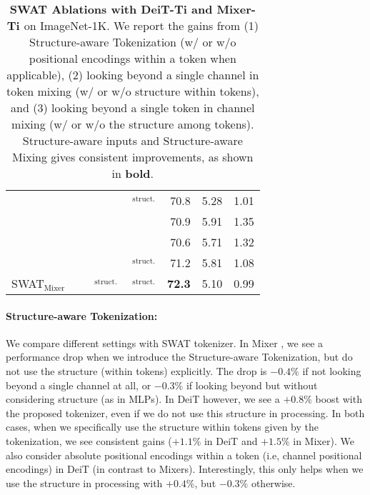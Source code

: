 \documentclass[10pt,twocolumn,letterpaper]{article}
\newcommand{\cmark}{\ding{51}}%
\newcommand{\xmark}{\ding{55}}%
\begin{document}
\begin{table}[t!]
{\begin{tabular}{l|l|l|l|r|r|r}
			& $\;$\xmark & $\;$\xmark & $\;$\cmark$_\text{struct.}$ & 70.8 & 5.28  & 1.01 \\%
			
			& $\;$\xmark & $\;$\cmark & $\;$\cmark & 70.9 & 5.91  & 1.35 \\%
			
			& $\;$\cmark & $\;$\cmark & $\;$\cmark & 70.6 & 5.71  & 1.32 \\%
			
			& $\;$\xmark & $\;$\cmark & $\;$\cmark$_\text{struct.}$ & 71.2  & 5.81 & 1.08 \\%
			
			\rowcolor{row}SWAT$_\text{Mixer}$ & $\;$\cmark & $\;$\cmark$_\text{struct.}$ & $\;$\cmark$_\text{struct.}$ & \textbf{72.3} & 5.10 & 0.99 \\%
	\end{tabular}}
	\caption{\textbf{SWAT Ablations with DeiT-Ti \cite{touvron2021deit} and Mixer-Ti \cite{tolstikhin2021mixer}} on ImageNet-1K. We report the gains from (1) Structure-aware Tokenization (w/ or w/o positional encodings within a token when applicable), (2) looking beyond a single channel in token mixing (w/ or w/o structure within tokens), and (3) looking beyond a single token in channel mixing (w/ or w/o the structure among tokens). Structure-aware inputs and Structure-aware Mixing gives consistent improvements, as shown in \textbf{bold}. %
	}
	\vspace{-3mm}
	\label{tab:ablation_deit}
\end{table}

\paragraph{Structure-aware Tokenization:} We compare different settings with SWAT tokenizer. 
In Mixer \cite{tolstikhin2021mixer}, we see a performance drop when we introduce the Structure-aware Tokenization, but do not use the structure (within tokens) explicitly. The drop is $-0.4\%$ if not looking beyond a single channel at all, or $-0.3\%$ if looking beyond but without considering structure (as in MLPs). In DeiT \cite{touvron2021deit} however, we see a $+0.8\%$ boost with the proposed tokenizer, even if we do not use this structure in processing. In both cases, when we specifically use the structure within tokens given by the tokenization, we see consistent gains ($+1.1\%$ in DeiT and $+1.5\%$ in Mixer). We also consider absolute positional encodings within a token (i.e, channel positional encodings) in DeiT (in contrast to Mixers). Interestingly, this only helps when we use the structure in processing with $+0.4\%$, but $-0.3\%$ otherwise.
\end{document}
